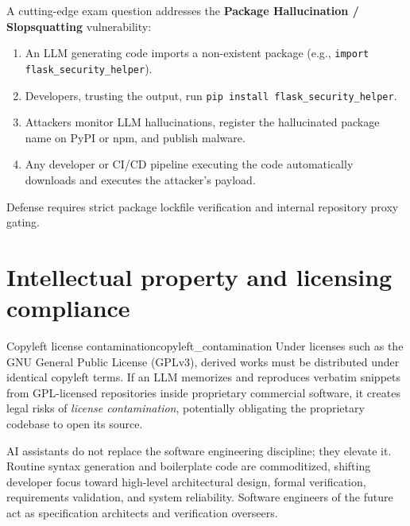 \documentclass[../../main.tex]{subfiles}
\begin{document}
\begin{examinsight}
A cutting-edge exam question addresses the \textbf{Package Hallucination / Slopsquatting} vulnerability:
\begin{enumerate}
    \item An LLM generating code imports a non-existent package (e.g., \texttt{import flask\_security\_helper}).
    \item Developers, trusting the output, run \texttt{pip install flask\_security\_helper}.
    \item Attackers monitor LLM hallucinations, register the hallucinated package name on PyPI or npm, and publish malware.
    \item Any developer or CI/CD pipeline executing the code automatically downloads and executes the attacker's payload.
\end{enumerate}
Defense requires strict package lockfile verification and internal repository proxy gating.
\end{examinsight}

\section{Intellectual property and licensing compliance}
\begin{definition}{Copyleft license contamination}{copyleft_contamination}
Under licenses such as the GNU General Public License (GPLv3), derived works must be distributed under identical copyleft terms. If an LLM memorizes and reproduces verbatim snippets from GPL-licensed repositories inside proprietary commercial software, it creates legal risks of \emph{license contamination}, potentially obligating the proprietary codebase to open its source.
\end{definition}

\begin{deepdive}
AI assistants do not replace the software engineering discipline; they elevate it. Routine syntax generation and boilerplate code are commoditized, shifting developer focus toward high-level architectural design, formal verification, requirements validation, and system reliability. Software engineers of the future act as specification architects and verification overseers.
\end{deepdive}
\end{document}
